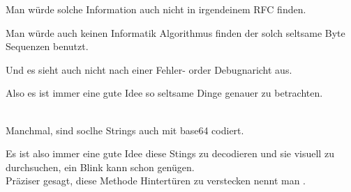 Man würde solche Information auch nicht in irgendeinem \ac{RFC} finden. %

Man würde auch keinen Informatik Algorithmus finden der solch seltsame Byte Sequenzen benutzt.


Und es sieht auch nicht nach einer Fehler- order Debugnaricht aus.


Also es ist immer eine gute Idee so seltsame Dinge genauer zu betrachten.\\
\\

Manchmal, sind soclhe Strings auch mit base64 codiert.

Es ist also immer eine gute Idee diese Stings zu decodieren und sie visuell zu durchsuchen, ein Blink
kann schon genügen.
\\
Präziser gesagt, diese Methode Hintertüren zu verstecken nennt man .


